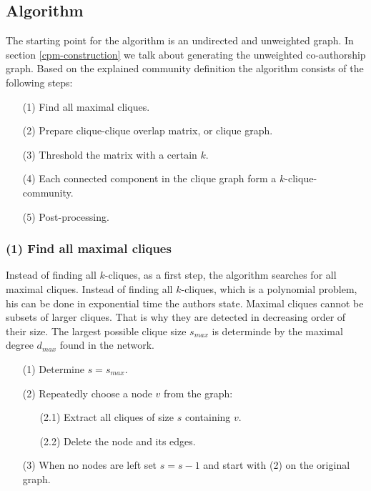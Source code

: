 \documentclass[runningheads,a4paper]{llncs}
\begin{document}
\subsection{Algorithm}
\label{cpm-algo}
The starting point for the algorithm is an undirected and unweighted graph. In section \ref{cpm-construction} we talk about generating the  unweighted co-authorship graph.
Based on the explained community definition the algorithm consists of the following steps:

\noindent
\colorbox{usethiscolorhere}{
\begin{minipage}{\dimexpr\textwidth-2\fboxsep}

\begin{enumerate}
\small
\item[(1)] Find all maximal cliques.
\item[(2)] Prepare clique-clique overlap matrix, or clique graph.
\item[(3)] Threshold the matrix with a certain $k$.
\item[(4)] Each connected component in the clique graph form a $k$-clique-community.
\item[(5)] Post-processing.
\end{enumerate}

\end{minipage}
}

\subsubsection{(1) Find all maximal cliques}
Instead of finding all $k$-cliques, as a first step, the algorithm searches for all maximal cliques. Instead of finding all $k$-cliques, which is a polynomial problem, his can be done in exponential time the authors state.
Maximal cliques cannot be subsets of larger cliques.
That is why they are detected in decreasing order of their size.
The largest possible clique size $s_{max}$ is determinde by the maximal degree $d_{max}$ found in the network.

\noindent
\colorbox{usethiscolorhere}{
\begin{minipage}{\dimexpr\textwidth-2\fboxsep}

\begin{enumerate}
\small
\item[(1)] Determine $s=s_{max}$.
\item[(2)] Repeatedly choose a node $v$ from the graph:
	\begin{enumerate}
		\item[(2.1)] Extract all cliques of size $s$ containing $v$.
		\item[(2.2)] Delete the node and its edges.
	\end{enumerate}
\item[(3)] When no nodes are left set $s=s-1$ and start with (2) on the original graph.
\end{enumerate}

\end{minipage}
}
\end{document}
